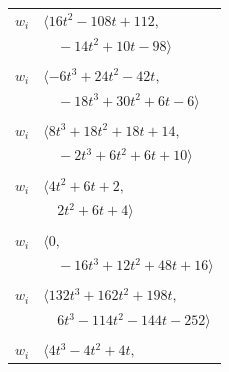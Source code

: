 \documentclass[11pt]{article}
\begin{document}
\begin{longtable}{@{}ll@{}}
$w_i$ & $\langle 16t^{2}-108t+112,$\\
 & $\quad -14t^{2}+10t-98\rangle$\\
\addlinespace[2pt]
\multicolumn{2}{@{}p{0.97\textwidth}@{}}{$i=17$, $D_i=1$, $\rho_{ij}$: $7{:}2, \allowbreak 13{:}2, \allowbreak 14{:}2, \allowbreak 21{:}2, \allowbreak 22{:}1, \allowbreak 29{:}2, \allowbreak 31{:}1, \allowbreak 32{:}2, \allowbreak 36{:}2$}\\
$w_i$ & $\langle -6t^{3}+24t^{2}-42t,$\\
 & $\quad -18t^{3}+30t^{2}+6t-6\rangle$\\
\addlinespace[2pt]
\multicolumn{2}{@{}p{0.97\textwidth}@{}}{$i=18$, $D_i=1$, $\rho_{ij}$: $6{:}1, \allowbreak 7{:}2, \allowbreak 8{:}2, \allowbreak 11{:}2, \allowbreak 31{:}1, \allowbreak 37{:}1$}\\
$w_i$ & $\langle 8t^{3}+18t^{2}+18t+14,$\\
 & $\quad -2t^{3}+6t^{2}+6t+10\rangle$\\
\addlinespace[2pt]
\multicolumn{2}{@{}p{0.97\textwidth}@{}}{$i=19$, $D_i=1$, $\rho_{ij}$: $7{:}2, \allowbreak 10{:}1, \allowbreak 13{:}2, \allowbreak 32{:}1, \allowbreak 42{:}2$}\\
$w_i$ & $\langle 4t^{2}+6t+2,$\\
 & $\quad 2t^{2}+6t+4\rangle$\\
\addlinespace[2pt]
\multicolumn{2}{@{}p{0.97\textwidth}@{}}{$i=20$, $D_i=1$, $\rho_{ij}$: $0{:}1, \allowbreak 2{:}1, \allowbreak 14{:}2, \allowbreak 25{:}2, \allowbreak 26{:}1, \allowbreak 29{:}2, \allowbreak 30{:}2, \allowbreak 32{:}2, \allowbreak 36{:}2$}\\
$w_i$ & $\langle 0,$\\
 & $\quad -16t^{3}+12t^{2}+48t+16\rangle$\\
\addlinespace[2pt]
\multicolumn{2}{@{}p{0.97\textwidth}@{}}{$i=21$, $D_i=1$, $\rho_{ij}$: $7{:}1, \allowbreak 17{:}1, \allowbreak 25{:}1, \allowbreak 26{:}1, \allowbreak 28{:}2, \allowbreak 30{:}2, \allowbreak 35{:}2, \allowbreak 38{:}1, \allowbreak 43{:}2, \allowbreak 44{:}1, \allowbreak 45{:}1$}\\
$w_i$ & $\langle 132t^{3}+162t^{2}+198t,$\\
 & $\quad 6t^{3}-114t^{2}-144t-252\rangle$\\
\addlinespace[2pt]
\multicolumn{2}{@{}p{0.97\textwidth}@{}}{$i=22$, $D_i=1$, $\rho_{ij}$: $2{:}2, \allowbreak 12{:}1, \allowbreak 14{:}2, \allowbreak 15{:}1, \allowbreak 17{:}2, \allowbreak 41{:}2$}\\
$w_i$ & $\langle 4t^{3}-4t^{2}+4t,$\\

\end{longtable}
\end{document}
